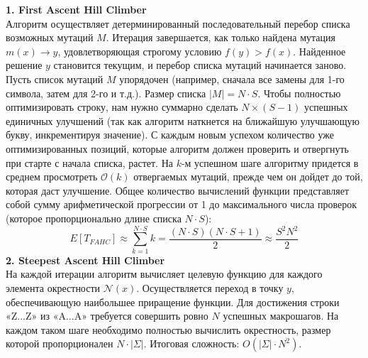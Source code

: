 \textbf{1. First Ascent Hill Climber} \\
Алгоритм осуществляет детерминированный последовательный перебор списка возможных мутаций $M$. Итерация завершается, как только найдена мутация $m(x) \to y$, удовлетворяющая строгому условию $f(y) > f(x)$. Найденное решение $y$ становится текущим, и перебор списка мутаций начинается заново. \\
Пусть список мутаций $M$ упорядочен (например, сначала все замены для 1-го символа, затем для 2-го и т.д.). Размер списка $|M| = N \cdot S$. Чтобы полностью оптимизировать строку, нам нужно суммарно сделать $N \times (S-1)$ успешных единичных улучшений (так как алгоритм наткнется на ближайшую улучшающую букву, инкрементируя значение). С каждым новым успехом количество уже оптимизированных позиций, которые алгоритм должен проверить и отвергнуть при старте с начала списка, растет. На $k$-м успешном шаге алгоритму придется в среднем просмотреть $\mathcal{O}(k)$ отвергаемых мутаций, прежде чем он дойдет до той, которая даст улучшение. Общее количество вычислений функции представляет собой сумму арифметической прогрессии от 1 до максимального числа проверок (которое пропорционально длине списка $N \cdot S$):
    $$E[T_{FAHC}] \approx \sum_{k=1}^{N \cdot S} k = \frac{(N \cdot S)(N \cdot S + 1)}{2} \approx \frac{S^2 N^2}{2}$$
\textbf{2. Steepest Ascent Hill Climber} \\
На каждой итерации алгоритм вычисляет целевую функцию для каждого элемента окрестности $\mathcal{N}(x)$. Осуществляется переход в точку $y$, обеспечивающую наибольшее приращение функции. Для достижения строки «Z...Z» из «A...A» требуется совершить ровно $N$ успешных макрошагов. На каждом таком шаге необходимо полностью вычислить окрестность, размер которой пропорционален $N \cdot |\Sigma|$.
Итоговая сложность: $O(|\Sigma| \cdot N^2)$. \\

